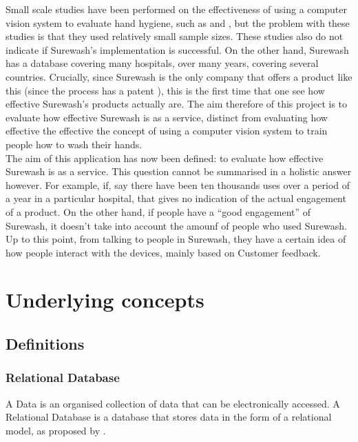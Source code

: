 Small scale studies have been performed on the effectiveness of using a computer vision system to evaluate hand hygiene, such as \cite{ghosh2011impact} and \cite{ghosh2013pilot}, but the problem with these studies is that they used relatively small sample sizes. These studies also do not indicate if Surewash's implementation is successful. On the other hand, Surewash has a database covering many hospitals, over many years, covering several countries. Crucially, since Surewash is the only company that offers a product like this (since the process has a patent \cite{handwashpatentglanta}), this is the first time that one see how effective Surewash's products actually are. The aim therefore of this project is to evaluate how effective Surewash is as a service, distinct from evaluating how effective the effective the concept of using a computer vision system to train people how to wash their hands.\\

The aim of this application has now been defined: to evaluate how effective Surewash is as a service. This question cannot be summarised in a holistic answer however. For example, if, say there have been ten thousands uses over a period of a year in a particular hospital, that gives no indication of the actual engagement of a product. On the other hand, if people have a ``good engagement'' of Surewash, it doesn't take into account the amounf of people who used Surewash.\\

Up to this point, from talking to people in Surewash, they have a certain idea of how people interact with the devices, mainly based on Customer feedback.\\


\section{Underlying concepts}
    \subsection{Definitions}
        \subsubsection{Relational Database}
        A Data is an organised collection of data that can be electronically accessed. A Relational Database is a database that stores data in the form of a relational model, as proposed by \cite{Codd}.
